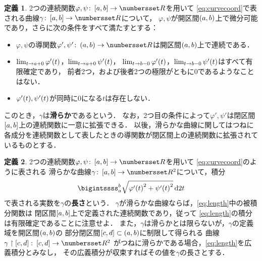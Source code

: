 \documentclass[11pt,a4paper]{ltjsarticle}
\newcommand*{\definition}[1]{\textbf{#1}}
\newcommand*{\maparrow}{\rightarrow}
\newcommand*{\intd}{\dl2}
\newcommand*{\restrict}{\upharpoonright}
\theoremstyle{definition}
\newtheorem{dfn}{定義}[section]
\begin{document}
\begin{dfn} \label{dfn:smooth}
  2つの連続関数$\varphi, \psi \colon \interval{c}{a,b} \maparrow \Real$を用いて
  \cref{eq:curvecoord}で表される曲線$\gamma \colon \interval{c}{a,b} \maparrow \Real$について，
  $\varphi, \psi$が開区間$\interval{op}{a,b}$上で微分可能であり，さらに次の条件をすべて満たすとする：
  \begin{itemize}
    \item $\varphi, \psi$の導関数$\varphi ', \psi ' \colon \interval{op}{a,b} \maparrow \Real$は開区間$\interval{op}{a,b}$上で連続である．
    \item $\lim_{t \to a + 0}\apply{\varphi '}{t}$，$\lim_{t \to a + 0}\apply{\psi '}{t}$，
      $\lim_{t \to b - 0}\apply{\varphi '}{t}$，$\lim_{t \to b - 0}\apply{\psi '}{t}$はすべて有限確定であり，
      前者2つ，および後者2つの極限がともに0であるようなことはない．
    \item $\apply{\varphi'}{t}, \apply{\psi'}{t}$が同時に0になる$t$は存在しない．
  \end{itemize}
  このとき，$\gamma$は\definition{滑らか}であるという．
  なお，2つ目の条件によって$\varphi', \psi'$は閉区間$\interval{c}{a,b}$上の連続関数に一意に拡張できる．
  以後，滑らかな曲線に関してはつねに各成分を連続関数として表したときの導関数が閉区間上の連続関数に拡張されているものとする．
\end{dfn}

\begin{dfn} \label{dfn:length}
  2つの連続関数$\varphi, \psi \colon \interval{c}{a,b} \maparrow \Real$を用いて
  \cref{eq:curvecoord}のように表される
  滑らかな曲線$\gamma \colon \interval{c}{a,b} \maparrow \Real^2$について，積分
  \begin{align}
    \bigintssss_a^b \sqrt{ \apply{\varphi '}{t}^2 + \apply{\psi '}{t}^2} \intd t
    \label{eq:length}
  \end{align}
  で表される実数を$\gamma$の\definition{長さ}という．
  $\gamma$が滑らかな曲線ならば，\cref{eq:length}中の被積分関数は
  閉区間$\interval{c}{a,b}$上で定義された連続関数であり，従って
  \cref{eq:length}の積分は有限確定であることに注意せよ．
  また，$\gamma$は滑らかとは限らないが，$\gamma$の定義域を開区間$\interval{op}{a,b}$の
  部分閉区間$\interval{c}{c,d} \subset \interval{op}{a,b}$に制限して得られる
  曲線$\gamma \restrict \interval{c}{c,d} \colon \interval{c}{c,d} \maparrow \Real^2$
  がつねに滑らかである場合，\cref{eq:length}を広義積分とみなし，
  その広義積分が収束すればその値を$\gamma$の長さとする．
\end{dfn}
\end{document}
